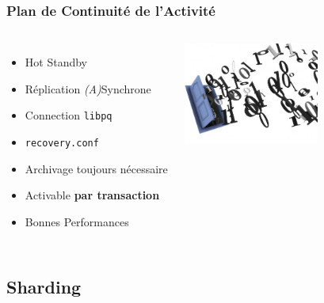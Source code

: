 \documentclass[english]{beamer}
\begin{document}
\begin{frame}[fragile]
  \frametitle{Plan de Continuité de l'Activité}

  \linebreak

\begin{columns}[c]

  \begin{itemize}
   \item<1-> \alert{Hot Standby}
   \item<2-> Réplication \textit{(A)}Synchrone
   \item<2-> Connection \texttt{libpq}
   \item<3-> \texttt{recovery.conf}
   \item<3-> Archivage toujours nécessaire
   \item<3-> Activable \textbf{par transaction}
   \item<4-> Bonnes Performances
  \end{itemize}  

\includegraphics[height=9em]{bits.jpeg}
\end{columns}
\end{frame}


\subsection{Sharding}
\end{document}

